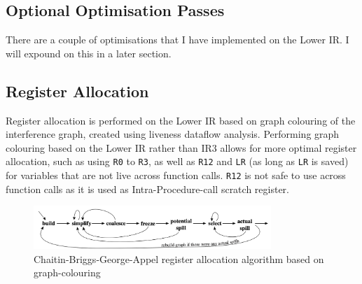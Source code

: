 \documentclass[nonacm, acmsmall, screen, 10pt]{acmart}
\begin{document}
\subsection{Optional Optimisation Passes}
There are a couple of optimisations that I have implemented on the Lower IR.
I will expound on this in a later section.

\subsection{Register Allocation}
Register allocation is performed on the Lower IR based on graph colouring of the interference graph, created using liveness dataflow analysis.
Performing graph colouring based on the Lower IR rather than IR3 allows for more optimal register allocation, such as using \texttt{R0} to \texttt{R3}, as well as \texttt{R12} and \texttt{LR} (as long as \texttt{LR} is saved) for variables that are not live across function calls.
\texttt{R12} is not safe to use across function calls as it is used as Intra-Procedure-call scratch register.

\begin{figure}[htpb]
  \centering
  \includegraphics[width=0.8\textwidth]{regallocgraph}
  \caption{Chaitin-Briggs-George-Appel register allocation algorithm based on graph-colouring}
  \label{fig:regallocgraph}
\end{figure}
\end{document}
